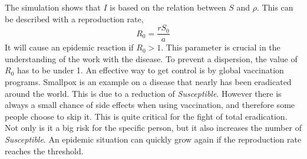 \documentclass[%
twoside,                 %
final,                   %
chapterprefix=true,      %
open=right               %
10pt]{book}
\begin{document}
The simulation shows that $I$ is based on the relation between $S$ and $\rho$. This can be described with a reproduction rate,
\begin{equation}
R_0 = \frac{rS_0}{a}
\end{equation}
It will cause an epidemic reaction if $R_0 > 1$. This parameter is crucial in the understanding of the work with the disease. To prevent a dispersion, the value of $R_0$ has to be under 1. An effective way to get control is by global vaccination programs. Smallpox is an example on a disease that nearly has been eradicated around the world. This is due to a reduction of \emph{Susceptible}. However there is always a small chance of side effects when using vaccination, and therefore some people choose to skip it. This is quite critical for the fight of total eradication. Not only is it a big risk for the specific person, but it also increases the number of \emph{Susceptible}. An epidemic situation can quickly grow again if the reproduction rate reaches the threshold.


\vspace{3mm}




\vspace{3mm}
\end{document}

